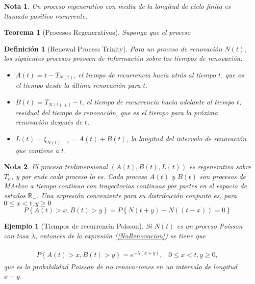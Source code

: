 \documentclass{article}
\newtheorem{Def}{Definición}[section]
\newtheorem{Ejem}{Ejemplo}[section]
\newtheorem{Teo}{Teorema}[section]
\newtheorem{Note}{Nota}[section]
\newcommand{\rea}{\mathbb{R}}
\numberwithin{equation}{section}
\begin{document}
{\begin{Note}
Un proceso regenerativo con media de la longitud de ciclo finita es llamado positivo recurrente.
\end{Note}

\begin{Teo}[Procesos Regenerativos]
Suponga que el proceso
\end{Teo}


\begin{Def}[Renewal Process Trinity]
Para un proceso de renovaci\'on $N\left(t\right)$, los siguientes procesos proveen de informaci\'on sobre los tiempos de renovaci\'on.
\begin{itemize}
\item $A\left(t\right)=t-T_{N\left(t\right)}$, el tiempo de recurrencia hacia atr\'as al tiempo $t$, que es el tiempo desde la \'ultima renovaci\'on para $t$.

\item $B\left(t\right)=T_{N\left(t\right)+1}-t$, el tiempo de recurrencia hacia adelante al tiempo $t$, residual del tiempo de renovaci\'on, que es el tiempo para la pr\'oxima renovaci\'on despu\'es de $t$.

\item $L\left(t\right)=\xi_{N\left(t\right)+1}=A\left(t\right)+B\left(t\right)$, la longitud del intervalo de renovaci\'on que contiene a $t$.
\end{itemize}
\end{Def}

\begin{Note}
El proceso tridimensional $\left(A\left(t\right),B\left(t\right),L\left(t\right)\right)$ es regenerativo sobre $T_{n}$, y por ende cada proceso lo es. Cada proceso $A\left(t\right)$ y $B\left(t\right)$ son procesos de MArkov a tiempo continuo con trayectorias continuas por partes en el espacio de estados $\rea_{+}$. Una expresi\'on conveniente para su distribuci\'on conjunta es, para $0\leq x<t,y\geq0$
\begin{equation}\label{NoRenovacion}
P\left\{A\left(t\right)>x,B\left(t\right)>y\right\}=
P\left\{N\left(t+y\right)-N\left((t-x)\right)=0\right\}
\end{equation}
\end{Note}

\begin{Ejem}[Tiempos de recurrencia Poisson]
Si $N\left(t\right)$ es un proceso Poisson con tasa $\lambda$, entonces de la expresi\'on (\ref{NoRenovacion}) se tiene que

\begin{eqnarray*}
\begin{array}{lc}
P\left\{A\left(t\right)>x,B\left(t\right)>y\right\}=e^{-\lambda\left(x+y\right)},&0\leq x<t,y\geq0,
\end{array}
\end{eqnarray*}
que es la probabilidad Poisson de no renovaciones en un intervalo de longitud $x+y$.


\end{Ejem}}
\end{document}

